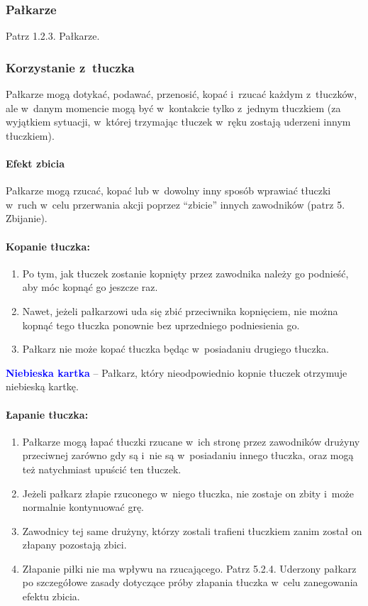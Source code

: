 \documentclass[12pt]{article}
\newcommand\bluecard[1]{\bgroup\textcolor{blue}{\textbf{#1}}}
\begin{document}
\subsubsection{Pałkarze}
Patrz 1.2.3. Pałkarze.

\subsubsection{Korzystanie z~tłuczka}

Pałkarze mogą dotykać, podawać, przenosić, kopać i~rzucać każdym z~tłuczków, ale w~danym momencie mogą być w~kontakcie tylko z~jednym
tłuczkiem (za wyjątkiem sytuacji, w~której trzymając tłuczek w~ręku
zostają uderzeni innym tłuczkiem).

\paragraph{Efekt zbicia}
Pałkarze mogą rzucać, kopać lub w~dowolny inny sposób wprawiać tłuczki w~ruch w~celu przerwania akcji
poprzez ``zbicie'' innych zawodników (patrz 5. Zbijanie).

\paragraph{Kopanie tłuczka:}

\begin{enumerate}
	\item
	      Po tym, jak tłuczek zostanie kopnięty przez zawodnika należy go
	      podnieść, aby móc kopnąć go jeszcze raz.
	\item
	      Nawet, jeżeli pałkarzowi uda się zbić przeciwnika kopnięciem, nie
	      można kopnąć tego tłuczka ponownie bez uprzedniego podniesienia go.
	\item
	      Pałkarz nie może kopać tłuczka będąc w~posiadaniu drugiego tłuczka.
\end{enumerate}

\bluecard{Niebieska kartka} -- Pałkarz, który nieodpowiednio kopnie tłuczek
otrzymuje niebieską kartkę.

\paragraph{Łapanie tłuczka:}

\begin{enumerate}
	\item
	      Pałkarze mogą łapać tłuczki rzucane w~ich stronę przez zawodników
	      drużyny przeciwnej zarówno gdy są i~nie są w~posiadaniu innego
	      tłuczka, oraz mogą też natychmiast upuścić ten tłuczek.
	\item
	      Jeżeli pałkarz złapie rzuconego w~niego tłuczka, nie zostaje on zbity
	      i~może normalnie kontynuować grę.
	\item
	      Zawodnicy tej same drużyny, którzy zostali trafieni tłuczkiem zanim
	      został on złapany pozostają zbici.
	\item
	      Złapanie piłki nie ma wpływu na rzucającego. Patrz 5.2.4. Uderzony
	      pałkarz po szczegółowe zasady dotyczące próby złapania tłuczka w~celu
	      zanegowania efektu zbicia.
\end{enumerate}
\end{document}
